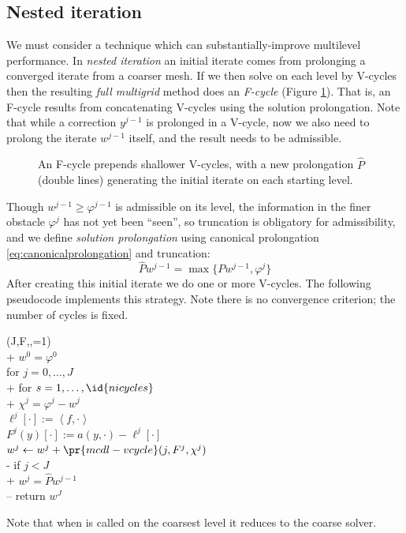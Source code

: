 \documentclass[letterpaper,final,12pt,reqno]{amsart}
\theoremstyle{claim}
\newcommand{\ip}[2]{\left<#1,#2\right>}
\numberwithin{equation}{section}
\numberwithin{figure}{section}
\numberwithin{table}{section}
\numberwithin{theorem}{section}
\begin{document}
\subsection*{Nested iteration} We must consider a technique which can substantially-improve multilevel performance.  In \emph{nested iteration} \cite{Trottenbergetal2001} an initial iterate comes from prolonging a converged iterate from a coarser mesh.  If we then solve on each level by V-cycles then the resulting \emph{full multigrid} method does an \emph{F-cycle} (Figure \ref{fig:fcycle}).  That is, an F-cycle results from concatenating V-cycles using the solution prolongation.  Note that while a correction $y^{j-1}$ is prolonged in a V-cycle, now we also need to prolong the iterate $w^{j-1}$ itself, and the result needs to be admissible.

\begin{figure}

\caption{An F-cycle prepends shallower V-cycles, with a new prolongation $\hat P$ (double lines) generating the initial iterate on each starting level.}
\label{fig:fcycle}
\end{figure}

Though $w^{j-1} \ge \varphi^{j-1}$ is admissible on its level, the information in the finer obstacle $\varphi^j$ has not yet been ``seen'', so truncation is obligatory for admissibility, and we define \emph{solution prolongation} using canonical prolongation \eqref{eq:canonicalprolongation} and truncation:
\begin{equation}
\hat P w^{j-1} = \max\{P w^{j-1}, \varphi^{j}\}  \label{eq:solutionprolongation}
\end{equation}
After creating this initial iterate we do one or more V-cycles.  The following pseudocode implements this strategy.  Note there is no convergence criterion; the number of cycles is fixed.
\begin{pseudo*} \label{ps:mcdl-fcycle}
(J,F,\varphi,=1)\text{:} \\+
    $w^0=\varphi^0$ \qquad\qquad\qquad\qquad\qquad\quad {} \\
    for $j=0,\dots,J$ \\+
        for $s=1,\dots,\id{nicycles}$ \qquad\qquad\qquad {} \\+
            $\chi^j = \varphi^j - w^j$ \qquad\qquad\qquad\quad {} \\
            $\ell^j[\cdot] := \ip{f}{\cdot}$ \\
            $F^j(y)[\cdot] := a(y,\cdot) - \ell^j[\cdot]$ \\
            $w^j \gets w^j+\pr{mcdl-vcycle}(j,F^j,\chi^j)$ \\-
        if $j < J$ \\+
            $w^j = \hat P w^{j-1}$ \qquad\qquad\qquad {} \\--
    return $w^J$
\end{pseudo*}
Note that when  is called on the coarsest level it reduces to the coarse solver.
\end{document}
